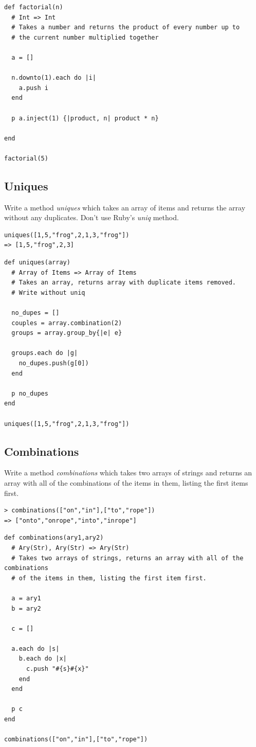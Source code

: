 \documentclass[11pt]{article}
\begin{document}
\begin{verbatim}
def factorial(n)
  # Int => Int
  # Takes a number and returns the product of every number up to 
  # the current number multiplied together

  a = []

  n.downto(1).each do |i|
    a.push i
  end

  p a.inject(1) {|product, n| product * n}

end

factorial(5)
\end{verbatim}

\subsection{Uniques}
\label{sec-1-3}

Write a method \emph{uniques} which takes an array of items and returns the array
without any duplicates. Don't use Ruby's \emph{uniq} method.

\begin{verbatim}
uniques([1,5,"frog",2,1,3,"frog"])
=> [1,5,"frog",2,3]
\end{verbatim}

\begin{verbatim}
def uniques(array)
  # Array of Items => Array of Items
  # Takes an array, returns array with duplicate items removed.
  # Write without uniq

  no_dupes = []
  couples = array.combination(2)
  groups = array.group_by{|e| e}

  groups.each do |g|
    no_dupes.push(g[0])
  end

  p no_dupes
end

uniques([1,5,"frog",2,1,3,"frog"])
\end{verbatim}

\subsection{Combinations}
\label{sec-1-4}

Write a method \emph{combinations} which takes two arrays of strings and returns
an array with all of the combinations of the items in them, listing the first
items first.

\begin{verbatim}
> combinations(["on","in"],["to","rope"])
=> ["onto","onrope","into","inrope"]
\end{verbatim}

\begin{verbatim}
def combinations(ary1,ary2)
  # Ary(Str), Ary(Str) => Ary(Str)
  # Takes two arrays of strings, returns an array with all of the combinations
  # of the items in them, listing the first item first.

  a = ary1
  b = ary2

  c = []

  a.each do |s|
    b.each do |x|
      c.push "#{s}#{x}"
    end
  end

  p c
end

combinations(["on","in"],["to","rope"])
\end{verbatim}
\end{document}
